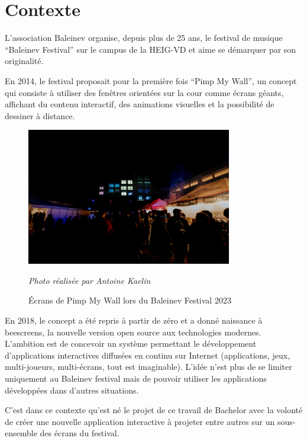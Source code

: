 \section{Contexte}
L'association Baleinev organise, depuis plus de 25 ans, le festival de musique “Baleinev Festival” sur le campus de la HEIG-VD et aime se démarquer par son originalité.

En 2014, le festival proposait pour la première fois “Pimp My Wall”, un concept qui consiste à utiliser des fenêtres orientées sur la cour comme écrans géants, affichant du contenu interactif, des animations visuelles et la possibilité de dessiner à distance.

\begin{figure}[H]
  \centering
  \includegraphics[width=0.8\textwidth]{assets/figures/pmw-ak.jpg}
  \begin{center}
    \textit{Photo réalisée par Antoine Kaelin}
  \end{center}
  \caption{Écrans de Pimp My Wall lors du Baleinev Festival 2023}
  \label{fig:pmw-baleinev-2023}
\end{figure}

En 2018, le concept a été repris à partir de zéro et a donné naissance à \gls{beescreens}, la nouvelle version open source aux technologies modernes. L'ambition est de concevoir un système permettant le développement d'applications interactives diffusées en continu sur Internet (applications, jeux, multi-joueurs, multi-écrans, tout est imaginable). L'idée n'est plus de se limiter uniquement au Baleinev festival mais de pouvoir utiliser les applications développées dans d'autres situations.

C'est dans ce contexte qu'est né le projet de ce travail de Bachelor avec la volonté de créer une nouvelle application interactive à projeter entre autres sur un sous-ensemble des écrans du festival.

